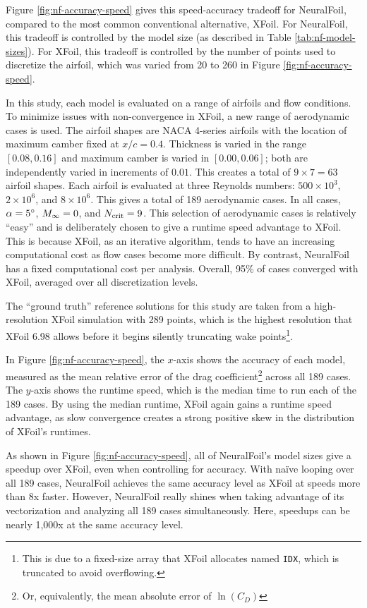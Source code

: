     Figure \ref{fig:nf-accuracy-speed} gives this speed-accuracy tradeoff for NeuralFoil, compared to the most common conventional alternative, XFoil. For NeuralFoil, this tradeoff is controlled by the model size (as described in Table \ref{tab:nf-model-sizes}). For XFoil, this tradeoff is controlled by the number of points used to discretize the airfoil, which was varied from 20 to 260 in Figure \ref{fig:nf-accuracy-speed}.

    In this study, each model is evaluated on a range of airfoils and flow conditions. To minimize issues with non-convergence in XFoil, a new range of aerodynamic cases is used. The airfoil shapes are NACA 4-series airfoils with the location of maximum camber fixed at $x/c=0.4$. Thickness is varied in the range $[0.08, 0.16]$ and maximum camber is varied in $[0.00, 0.06]$; both are independently varied in increments of $0.01$. This creates a total of $9\times7=63$ airfoil shapes. Each airfoil is evaluated at three Reynolds numbers: $500\times10^3$, $2\times10^6$, and $8\times10^6$. This gives a total of 189 aerodynamic cases. In all cases, $\alpha=5\degree$, $M_\infty=0$, and $N_{\rm crit}=9$. This selection of aerodynamic cases is relatively ``easy'' and is deliberately chosen to give a runtime speed advantage to XFoil. This is because XFoil, as an iterative algorithm, tends to have an increasing computational cost as flow cases become more difficult. By contrast, NeuralFoil has a fixed computational cost per analysis. Overall, 95\% of cases converged with XFoil, averaged over all discretization levels.

    The ``ground truth'' reference solutions for this study are taken from a high-resolution XFoil simulation with 289 points, which is the highest resolution that XFoil 6.98 allows before it begins silently truncating wake points\footnote{This is due to a fixed-size array that XFoil allocates named \texttt{IDX}, which is truncated to avoid overflowing.}.

    In Figure \ref{fig:nf-accuracy-speed}, the $x$-axis shows the accuracy of each model, measured as the mean relative error of the drag coefficient\footnote{Or, equivalently, the mean absolute error of $\ln(C_D)$} across all 189 cases. The $y$-axis shows the runtime speed, which is the median time to run each of the 189 cases. By using the median runtime, XFoil again gains a runtime speed advantage, as slow convergence creates a strong positive skew in the distribution of XFoil's runtimes.

    As shown in Figure \ref{fig:nf-accuracy-speed}, all of NeuralFoil's model sizes give a speedup over XFoil, even when controlling for accuracy. With naïve looping over all 189 cases, NeuralFoil achieves the same accuracy level as XFoil at speeds more than 8x faster. However, NeuralFoil really shines when taking advantage of its vectorization and analyzing all 189 cases simultaneously. Here, speedups can be nearly 1,000x at the same accuracy level.

